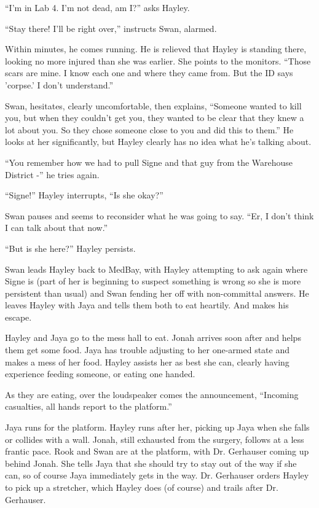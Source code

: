 ``I'm in Lab 4.  I'm not dead, am I?'' asks Hayley.

``Stay there!  I'll be right over,'' instructs Swan, alarmed.

Within minutes, he comes running.  He is relieved that Hayley is standing there, looking no more injured than she was earlier.  She points to the monitors.  ``Those scars are mine.  I know each one and where they came from.  But the ID says 'corpse.'   I don't understand.''

Swan, hesitates, clearly uncomfortable, then explains, ``Someone wanted to kill you, but when they couldn't get you, they wanted to be clear that they knew a lot about you.  So they chose someone close to you and did this to them.''  He looks at her significantly, but Hayley clearly has no idea what he's talking about.

``You remember how we had to pull Signe and that guy from the Warehouse District -'' he tries again.

``Signe!''  Hayley interrupts, ``Is she okay?''

Swan pauses and seems to reconsider what he was going to say.  ``Er, I don't think I can talk about that now.''

``But is she here?'' Hayley persists.

Swan leads Hayley back to MedBay, with Hayley attempting to ask again where Signe is (part of her is beginning to suspect something is wrong so she is more persistent than usual) and Swan fending her off with non-committal answers.  He leaves Hayley with Jaya and tells them both to eat heartily.  And makes his escape.



Hayley and Jaya go to the mess hall to eat.  Jonah arrives soon after and helps them get some food.  Jaya has trouble adjusting to her one-armed state and makes a mess of her food.  Hayley assists her as best she can, clearly having experience feeding someone, or eating one handed.  



As they are eating, over the loudspeaker comes the announcement, ``Incoming casualties, all hands report to the platform.''



Jaya runs for the platform. Hayley runs after her, picking up Jaya when she falls or collides with a wall.  Jonah, still exhausted from the surgery, follows at a less frantic pace.  Rook and Swan are at the platform, with Dr. Gerhauser coming up behind Jonah.  She tells Jaya that she should try to stay out of the way if she can, so of course Jaya immediately gets in the way.  Dr. Gerhauser orders Hayley to pick up a stretcher, which Hayley does (of course) and trails after Dr. Gerhauser.



